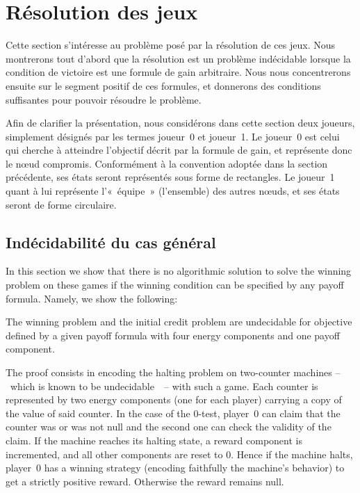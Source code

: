 \section{Résolution des jeux}
\label{tj:sec:algo}

Cette section s'intéresse au problème posé par la résolution de ces jeux.
Nous montrerons tout d'abord que la résolution est un problème indécidable lorsque la condition de victoire est une formule de gain arbitraire.
Nous nous concentrerons ensuite sur le segment positif de ces formules, et donnerons des conditions suffisantes pour pouvoir résoudre le problème.

\newcommand\jo{joueur~0\xspace}
\newcommand\ji{joueur~1\xspace}
Afin de clarifier la présentation, nous considérons dans cette section deux joueurs, simplement désignés par les termes \jo et \ji.
Le \jo est celui qui cherche à atteindre l'objectif décrit par la formule de gain, et représente donc le nœud compromis.
Conformément à la convention adoptée dans la section précédente, ses états seront représentés sous forme de rectangles.
Le \ji quant à lui représente l'« équipe » (l'ensemble) des autres nœuds, et ses états seront de forme circulaire.

\subsection{Indécidabilité du cas général}


In this section we show that there is no algorithmic solution to solve the winning problem on these games if the winning condition can be specified by any payoff formula.
Namely, we show the following:
\begin{theorem}
The winning problem and the initial credit problem are undecidable for objective defined by a given payoff formula with four energy components and one payoff component.
\end{theorem}

The proof consists in encoding the halting problem on two-counter machines --~which is known to be undecidable~\cite{minsky67}~-- with such a game.
Each counter is represented by two energy components (one for each player) carrying a copy of the value of said counter.
In the case of the $0$-test, player~0 can claim that the counter was or was not null and the second one can check the validity of the claim.
If the machine reaches its halting state, a reward component is incremented, and all other components are reset to $0$.
Hence if the machine halts, player~0 has a winning strategy (encoding faithfully the machine's behavior) to get a strictly positive reward.
Otherwise the reward remains null. 

